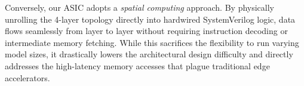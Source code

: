 Conversely, our ASIC adopts a \textit{spatial computing} approach. By physically unrolling the 4-layer topology directly into hardwired SystemVerilog logic, data flows seamlessly from layer to layer without requiring instruction decoding or intermediate memory fetching. While this sacrifices the flexibility to run varying model sizes, it drastically lowers the architectural design difficulty and directly addresses the high-latency memory accesses that plague traditional edge accelerators.
